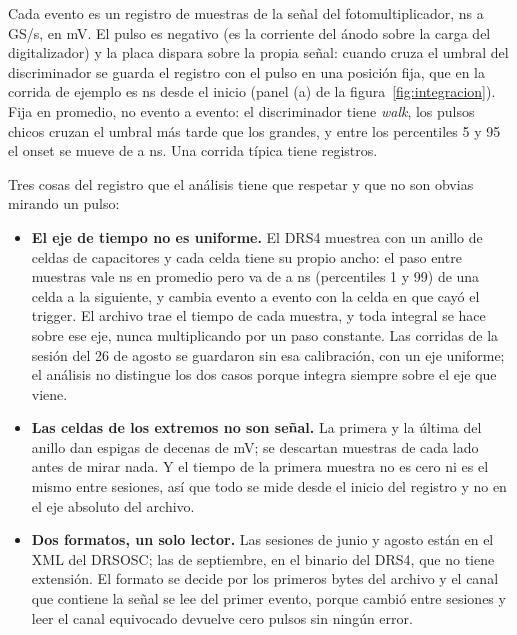 \documentclass[11pt,a4paper]{article}
\begin{document}
Cada evento es un registro de \Muestras{} muestras de la señal del
fotomultiplicador, \Registro{} ns a \Muestreo{} GS/s, en mV. El pulso es
negativo (es la corriente del ánodo sobre la carga del digitalizador) y la
placa dispara sobre la propia señal: cuando cruza el umbral del discriminador
se guarda el registro con el pulso en una posición fija, que en la corrida de
ejemplo es \EjOnsetMediano{} ns desde el inicio (panel (a) de la
figura~\ref{fig:integracion}). Fija en promedio, no evento a evento: el
discriminador tiene \emph{walk}, los pulsos chicos cruzan el umbral más tarde
que los grandes, y entre los percentiles 5 y 95 el onset se mueve de
\EjOnsetCinco{} a \EjOnsetNoventaycinco{} ns. Una corrida típica tiene
\EventosTipico{} registros.

Tres cosas del registro que el análisis tiene que respetar y que no son
obvias mirando un pulso:

\begin{itemize}
\item \textbf{El eje de tiempo no es uniforme.} El DRS4 muestrea con un anillo
      de celdas de capacitores y cada celda tiene su propio ancho: el paso
      entre muestras vale \DtMedio{} ns en promedio pero va de \DtMin{} a
      \DtMax{} ns (percentiles 1 y 99) de una celda a la siguiente, y cambia
      evento a evento con la celda en que cayó el trigger. El archivo trae el
      tiempo de cada muestra, y toda integral se hace sobre ese eje, nunca
      multiplicando por un paso constante. Las corridas de la sesión del 26 de
      agosto se guardaron sin esa calibración, con un eje uniforme; el análisis
      no distingue los dos casos porque integra siempre sobre el eje que viene.
\item \textbf{Las celdas de los extremos no son señal.} La primera y la última
      del anillo dan espigas de decenas de mV; se descartan \RecorteBordes{}
      muestras de cada lado antes de mirar nada. Y el tiempo de la primera
      muestra no es cero ni es el mismo entre sesiones, así que todo se mide
      desde el inicio del registro y no en el eje absoluto del archivo.
\item \textbf{Dos formatos, un solo lector.} Las sesiones de junio y agosto
      están en el XML del DRSOSC; las de septiembre, en el binario del DRS4,
      que no tiene extensión. El formato se decide por los primeros bytes del
      archivo y el canal que contiene la señal se lee del primer evento, porque
      cambió entre sesiones y leer el canal equivocado devuelve cero pulsos sin
      ningún error.
\end{itemize}
\end{document}
